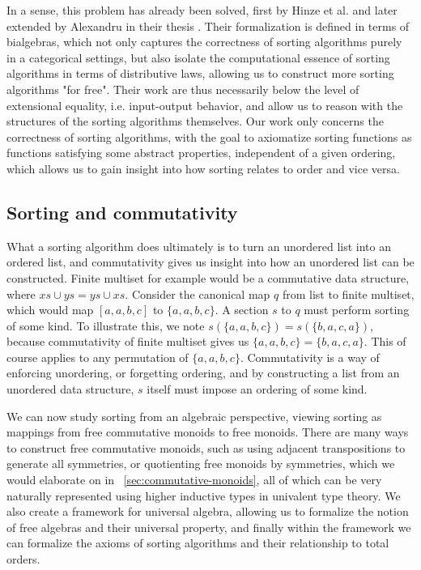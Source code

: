 In a sense, this problem has already been solved, first by Hinze et al. \cite{10.1145/2364394.2364405}
and later extended by Alexandru in their thesis \cite{alexandru_intrinsically_2023}.
Their formalization is defined in terms of bialgebras, which not
only captures the correctness of sorting algorithms purely in a categorical settings, but
also isolate the computational essence of sorting algorithms in terms of distributive laws,
allowing us to construct more sorting algorithms "for free". Their work are thus necessarily
below the level of extensional equality, i.e. input-output behavior, and allow us to reason
with the structures of the sorting algorithms themselves. Our work only concerns the correctness
of sorting algorithms, with the goal to axiomatize sorting functions as functions satisfying
some abstract properties, independent of a given ordering, which allows us to gain
insight into how sorting relates to order and vice versa.

\subsection*{Sorting and commutativity}
What a sorting algorithm does ultimately is to turn an unordered list into an ordered list,
and commutativity gives us insight into how an unordered list can be constructed.
Finite multiset for example would be a commutative data structure, where $xs \cup ys = ys \cup xs$.
Consider the canonical map $q$ from list to finite multiset, which would map
$[a, a, b, c]$ to $\{a, a, b, c\}$. A section $s$ to $q$ must perform sorting of some kind.
To illustrate this, we note $s(\{a, a, b, c\}) = s(\{b, a, c, a\})$, because commutativity
of finite multiset gives us $\{a, a, b, c\} = \{b, a, c, a\}$. This of course applies to
any permutation of $\{a, a, b, c\}$. Commutativity is a way of enforcing unordering,
or forgetting ordering, and by constructing a list from an unordered data structure, $s$ itself
must impose an ordering of some kind.

We can now study sorting from an algebraic perspective, viewing sorting as mappings from free commutative
monoids to free monoids. There are many ways to construct free commutative monoids, such as using adjacent transpositions to generate all symmetries, or quotienting free monoids by symmetries, which we would
elaborate on in ~\cref{sec:commutative-monoids}, all of which can be very naturally represented
using higher inductive types in univalent type theory. We also
create a framework for universal algebra, allowing us to formalize the notion of free algebras and
their universal property, and finally within the framework we can formalize the axioms of sorting
algorithms and their relationship to total orders.

